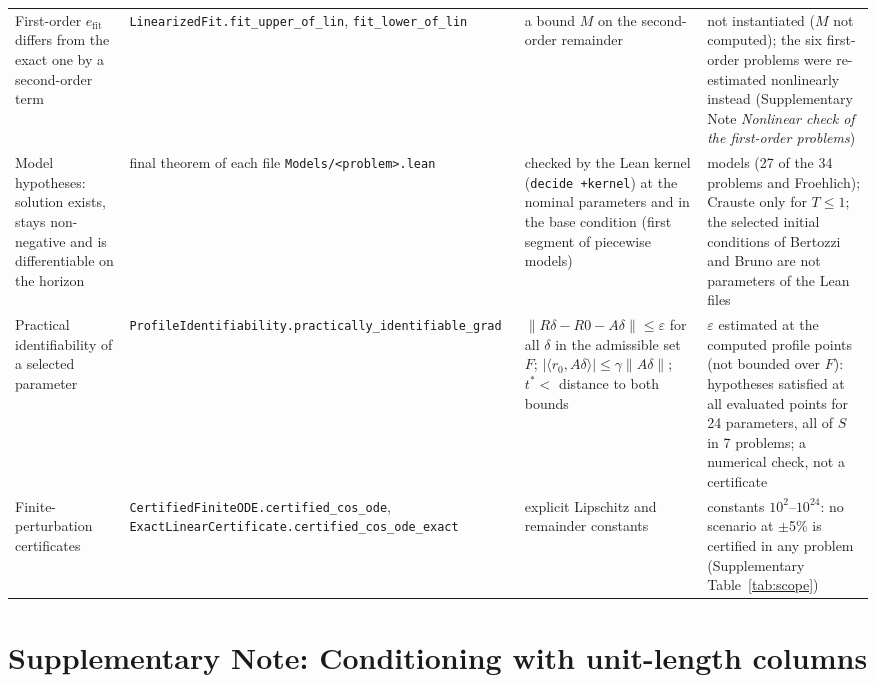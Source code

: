 \begin{longtable}{@{}>{\raggedright\arraybackslash}p{3.0cm}>{\raggedright\arraybackslash}p{3.4cm}>{\raggedright\arraybackslash}p{4.2cm}>{\raggedright\arraybackslash}p{4.4cm}@{}}
\addlinespace[3pt]
First-order $e_{\mathrm{fit}}$ differs from the exact one by a second-order term & \texttt{LinearizedFit.\allowbreak{}fit\_\allowbreak{}upper\_\allowbreak{}of\_\allowbreak{}lin}, \texttt{fit\_\allowbreak{}lower\_\allowbreak{}of\_\allowbreak{}lin} & a bound $M$ on the second-order remainder & not instantiated ($M$ not computed); the six first-order problems were re-estimated nonlinearly instead (Supplementary Note \textit{Nonlinear check of the first-order problems}) \\
\addlinespace[3pt]
Model hypotheses: solution exists, stays non-negative and is differentiable on the horizon & final theorem of each file \texttt{Models/\allowbreak{}<problem>.\allowbreak{}lean} & checked by the Lean kernel (\texttt{decide +kernel}) at the nominal parameters and in the base condition (first segment of piecewise models) & 28 models (27 of the 34 problems and Froehlich); Crauste only for $T\le1$; the selected initial conditions of Bertozzi and Bruno are not parameters of the Lean files \\
\addlinespace[3pt]
Practical identifiability of a selected parameter & \texttt{ProfileIdentifiability.\allowbreak{}practically\_\allowbreak{}identifiable\_\allowbreak{}grad} & $\|R\delta-R0-A\delta\|\le\varepsilon$ for all $\delta$ in the admissible set $F$; $|\langle r_0,A\delta\rangle|\le\gamma\|A\delta\|$; $t^\ast<$ distance to both bounds & $\varepsilon$ estimated at the computed profile points (not bounded over $F$): hypotheses satisfied at all evaluated points for 24 parameters, all of $S$ in 7 problems; a numerical check, not a certificate \\
\addlinespace[3pt]
Finite-perturbation certificates & \texttt{CertifiedFiniteODE.\allowbreak{}certified\_\allowbreak{}cos\_\allowbreak{}ode}, \texttt{ExactLinearCertificate.\allowbreak{}certified\_\allowbreak{}cos\_\allowbreak{}ode\_\allowbreak{}exact} & explicit Lipschitz and remainder constants & constants $10^2$--$10^{24}$: no scenario at $\pm$5\% is certified in any problem (Supplementary Table~\ref{tab:scope}) \\
\bottomrule
\end{longtable}
\endgroup

\section*{Supplementary Note: Conditioning with unit-length columns}

